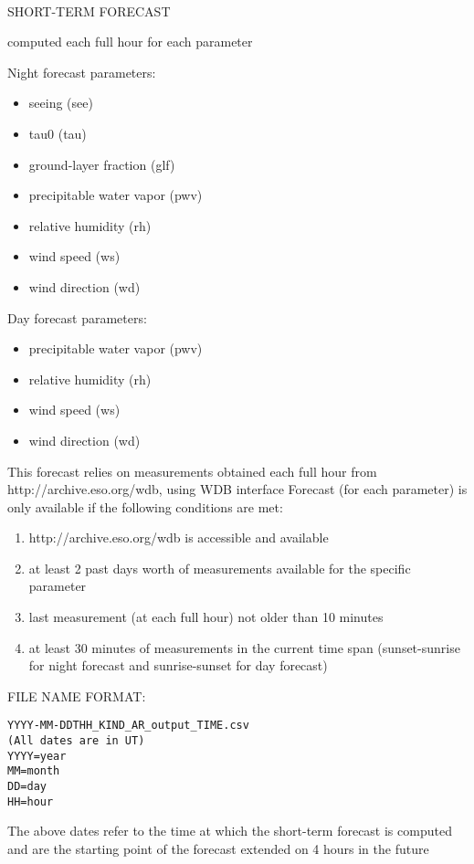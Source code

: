 \begin{center}
\HRule \\[0.4cm]
SHORT-TERM FORECAST
\HRule \\[0.4cm]
\end{center}

computed each full hour for each parameter

Night forecast parameters:
\begin{itemize}
        \item seeing (see)
        \item tau0 (tau)
        \item ground-layer fraction (glf)
        \item precipitable water vapor (pwv)
        \item relative humidity (rh)
        \item wind speed (ws)
        \item wind direction (wd)
\end{itemize}
Day forecast parameters:
\begin{itemize}
        \item precipitable water vapor (pwv)
        \item relative humidity (rh)
        \item wind speed (ws)
        \item wind direction (wd)      
\end{itemize}
This forecast relies on measurements obtained each full hour from http://archive.eso.org/wdb, using WDB interface
Forecast (for each parameter) is only available if the following conditions are met:
\begin{enumerate}
\item http://archive.eso.org/wdb is accessible and available
\item at least 2 past days worth of measurements available for the specific parameter
\item last measurement (at each full hour) not older than 10 minutes
\item at least 30 minutes of measurements in the current time span (sunset-sunrise for night forecast and sunrise-sunset for day forecast)
\end{enumerate}

FILE NAME FORMAT:
\begin{verbatim}
YYYY-MM-DDTHH_KIND_AR_output_TIME.csv
(All dates are in UT)
YYYY=year
MM=month
DD=day
HH=hour
\end{verbatim}
The above dates refer to the time at which the short-term forecast is computed and are the starting point of the forecast extended on 4 hours in the future

